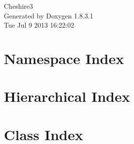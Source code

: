 \documentclass{book}
\begin{document}
\hypersetup{pageanchor=false,citecolor=blue}
\begin{titlepage}
\vspace*{7cm}
\begin{center}
{\Large Cheshire3 }\\
\vspace*{1cm}
{\large Generated by Doxygen 1.8.3.1}\\
\vspace*{0.5cm}
{\small Tue Jul 9 2013 16:22:02}\\
\end{center}
\end{titlepage}
\clearemptydoublepage
{}
\tableofcontents
\clearemptydoublepage
{}
\hypersetup{pageanchor=true,citecolor=blue}
\chapter{Namespace Index}

\chapter{Hierarchical Index}

\chapter{Class Index}

\end{document}
